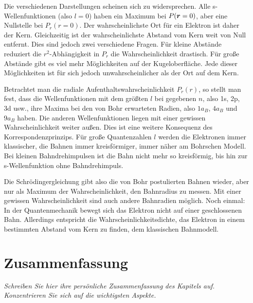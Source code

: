Die verschiedenen Darstellungen scheinen sich zu widersprechen. Alle s-Wellenfunktionen (also $l=0$) haben ein Maximum bei $P(\boldsymbol{r} = 0)$, aber eine Nullstelle bei $P_r(r=0)$. Der wahrscheinlichste Ort für ein Elektron ist daher der Kern. Gleichzeitig ist der wahrscheinlichste Abstand vom Kern weit von Null entfernt.  Dies sind jedoch zwei verschiedene Fragen. Für kleine Abstände reduziert die $r^2$-Abhängigkeit in $P_r$ die Wahrscheinlichkeit drastisch. Für große Abstände gibt es viel mehr Möglichkeiten auf der Kugeloberfläche. Jede dieser Möglichkeiten ist für sich jedoch unwahrscheinlicher als der Ort auf dem Kern.


Betrachtet man die radiale Aufenthaltswahrscheinlichkeit $P_r(r)$, so stellt man fest, dass die Wellenfunktionen mit dem größten $l$ bei gegebenen $n$, also 1s, 2p, 3d usw., ihre Maxima bei den von Bohr erwarteten Radien, also $1 a_B$, $4 a_B$ und $9 a_B$ haben. Die anderen Wellenfunktionen liegen mit einer gewissen Wahrscheinlichkeit weiter außen. Dies ist eine weitere Konsequenz des Korrespondenzprinzips. Für große Quantenzahlen $l$ werden die Elektronen immer klassischer, die Bahnen immer kreisförmiger, immer näher am Bohrschen Modell. Bei kleinen Bahndrehimpulsen ist die Bahn nicht mehr so kreisförmig, bis hin zur s-Wellenfunktion ohne Bahndrehimpuls.

Die Schrödingergleichung gibt also die von Bohr postulierten Bahnen wieder, aber nur als Maximum der Wahrscheinlichkeit, den Bahnradius zu messen. Mit einer gewissen Wahrscheinlichkeit sind auch andere Bahnradien möglich. Noch einmal: In der Quantenmechanik bewegt sich das Elektron nicht auf einer geschlossenen Bahn. Allerdings entspricht die Wahrscheinlichkeitsdichte, das Elektron in einem bestimmten Abstand vom Kern zu finden, dem klassischen Bahnmodell.

\section{Zusammenfassung}

\textit{Schreiben Sie hier ihre persönliche Zusammenfassung des Kapitels auf. Konzentrieren Sie sich auf die wichtigsten Aspekte.}

\vspace*{10cm}



\printbibliography[segment=\therefsegment,heading=subbibliography]
